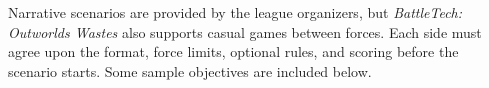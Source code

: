 Narrative scenarios are provided by the league organizers, but \emph{BattleTech: Outworlds Wastes} also supports casual games between forces.
Each side must agree upon the format, force limits, optional rules, and scoring before the scenario starts.
Some sample objectives are included below.
